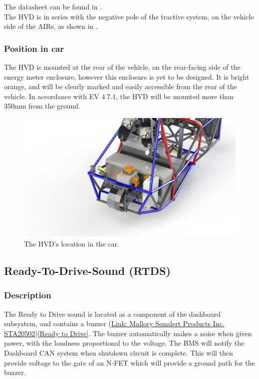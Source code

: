 \documentclass{article}
\begin{document}
The datasheet can be found in .\\

The HVD is in series with the negative pole of the tractive system, on the vehicle side of the AIRs, as shown in . 

\subsubsection{Position in car}
The HVD is mounted at the rear of the vehicle, on the rear-facing side of the energy meter enclosure, however this enclosure is yet to be designed. It is bright orange, and will be clearly marked and easily accessible from the rear of the vehicle. In accordance with EV 4.7.1, the HVD will be mounted more than 350mm from the ground.  

\begin{figure}[h]
\centering
\includegraphics[width=.75\textwidth]{hvd.png}
\caption{The HVD's location in the car.}
\label{fig:hvd}
\end{figure}


\subsection{Ready-To-Drive-Sound (RTDS)}\label{ready_to_drive_sound}
\subsubsection{Description}
The Ready to Drive sound is located as a component of the dashboard subsystem, and contains a buzzer (\href{http://www.mallory-sonalert.com/specifications/STA20502.PDF}{Link: Mallory Sonalert Products Inc. STA20502})\ref{Ready to Drive}. The buzzer automatically makes a noise when given power, with the loudness proportional
to the voltage. The BMS will notify the Dashboard CAN system when shutdown circuit is complete. This will then provide voltage to the gate of an N-FET which will provide a ground path for the buzzer.
\end{document}
